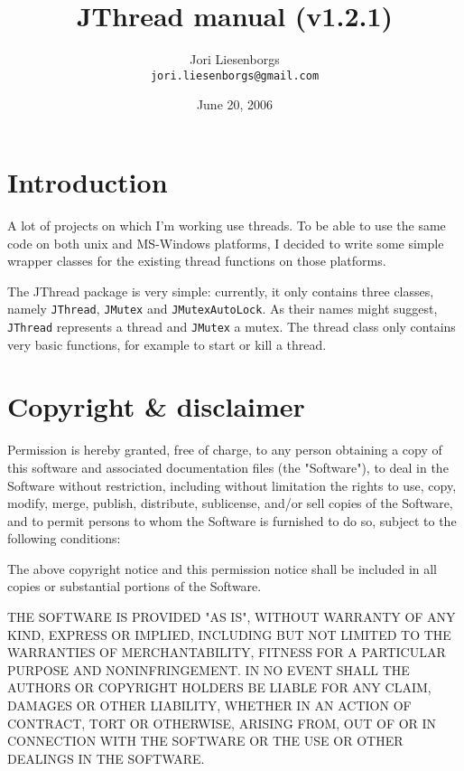\documentclass[a4paper,12pt]{article}
\begin{document}
	\title{JThread manual (v1.2.1)}
	\author{Jori Liesenborgs\\
	        {\tt jori.liesenborgs@gmail.com} }
	\date{June 20, 2006}
	\maketitle

	\section{Introduction}

	A lot of projects on which I'm working use threads. To be able to
	use the same code on both unix and MS-Windows platforms, I decided
	to write some simple wrapper classes for the existing thread functions
	on those platforms.

	The JThread package is very simple: currently, it only contains three
	classes, namely {\tt JThread}, {\tt JMutex} and {\tt JMutexAutoLock}. 
	As their names might
	suggest, {\tt JThread} represents a thread and {\tt JMutex} a mutex.
	The thread class only contains very basic functions, for example to
	start or kill a thread.

	\section{Copyright \& disclaimer}

	Permission is hereby granted, free of charge, to any person obtaining a
	copy of this software and associated documentation files (the "Software"),
	to deal in the Software without restriction, including without limitation
	the rights to use, copy, modify, merge, publish, distribute, sublicense,
	and/or sell copies of the Software, and to permit persons to whom the
	Software is furnished to do so, subject to the following conditions:

	The above copyright notice and this permission notice shall be included
	in all copies or substantial portions of the Software.

	THE SOFTWARE IS PROVIDED "AS IS", WITHOUT WARRANTY OF ANY KIND, EXPRESS
	OR IMPLIED, INCLUDING BUT NOT LIMITED TO THE WARRANTIES OF MERCHANTABILITY,
	FITNESS FOR A PARTICULAR PURPOSE AND NONINFRINGEMENT.  IN NO EVENT SHALL
	THE AUTHORS OR COPYRIGHT HOLDERS BE LIABLE FOR ANY CLAIM, DAMAGES OR OTHER
	LIABILITY, WHETHER IN AN ACTION OF CONTRACT, TORT OR OTHERWISE, ARISING
	FROM, OUT OF OR IN CONNECTION WITH THE SOFTWARE OR THE USE OR OTHER DEALINGS
	IN THE SOFTWARE.
\end{document}

